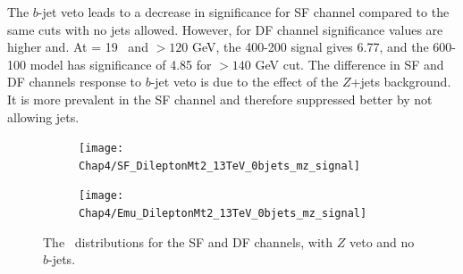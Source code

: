 The $b$-jet veto leads to a decrease in significance for SF channel compared to the same cuts with no jets allowed. However, for DF channel significance values are higher and. At \lumi= 19 \invfb \, and \mttwo $>120$ GeV, the 400-200 signal gives  6.77, and the 600-100 model has significance of 4.85 for  \mttwo$>140$ GeV cut. The difference in SF and DF channels response to $b$-jet veto is due to the effect of the $Z$+jets background. It is more prevalent in the SF channel and therefore suppressed better by not allowing jets. 

 

\begin{figure}[H]	   
	\begin{subfigure}[t]{0.5\textwidth}
		\label{fig:SF_0jets_mz_mt2}
        \texttt{[image: Chap4/SF\_DileptonMt2\_13TeV\_0bjets\_mz\_signal]} 
        \end{subfigure} 
     \begin{subfigure}[t]{0.5\textwidth}
     	\label{fig:SF_0jets_mz_metrel}
        \texttt{[image: Chap4/Emu\_DileptonMt2\_13TeV\_0bjets\_mz\_signal]} 
        \end{subfigure}
        \captionsetup{width=0.8\textwidth}
\caption{The \mttwo \, distributions for the SF and DF channels, with $Z$ veto and no $b$-jets.}	
        \label{fig:SF_0bjets_mz}
\end{figure}
